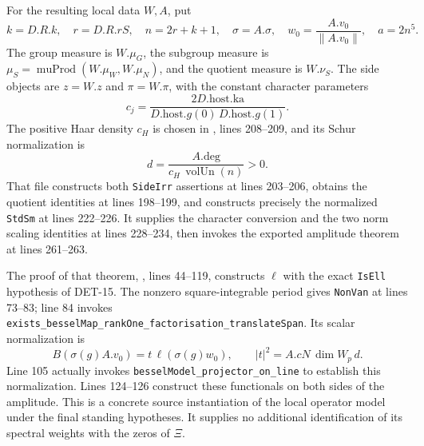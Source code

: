 \documentclass[11pt,a4paper]{article}
\newcommand{\fid}[1]{\textsf{#1}}
\begin{document}
For the resulting local data \(W,A\), put
\[
 k=D.R.k,\quad r=D.R.rS,\quad n=2r+k+1,\quad
 \sigma=A.\sigma,\quad w_0=\frac{A.v_0}{\|A.v_0\|},\quad a=2n^5.
\]
The group measure is \(W.\mu_G\), the subgroup measure is
\(\mu_S=\operatorname{muProd}(W.\mu_W,W.\mu_N)\), and the quotient
measure is \(W.\nu_S\).  The side objects are \(z=W.z\) and
\(\pi=W.\pi\), with the constant character parameters
\[
 c_j=\frac{2D.\mathrm{host}.\mathrm{ka}}
 {D.\mathrm{host}.g(0)\,D.\mathrm{host}.g(1)}.
\]
The positive Haar density \(c_H\) is chosen in
, lines 208--209, and its Schur
normalization is
\[
 d=\frac{A.\mathrm{deg}}{c_H\,\operatorname{volUn}(n)}>0.
\]
That file constructs both \texttt{SideIrr} assertions at lines
203--206, obtains the quotient identities at lines 198--199,
and constructs precisely the normalized \texttt{StdSm} at lines
222--226.  It supplies the character conversion and the two norm
scaling identities at lines 228--234, then invokes the exported
amplitude theorem at lines 261--263.

The proof of that theorem,
,
lines 44--119, constructs \(\ell\) with the exact
\texttt{IsEll} hypothesis of \fid{DET-15}.
The nonzero square-integrable period gives \texttt{NonVan} at
lines 73--83; line 84 invokes
\texttt{exists\_besselMap\_rankOne\_factorisation\_translateSpan}.
Its scalar normalization is
\[
 B(\sigma(g)A.v_0)=t\,\ell(\sigma(g)w_0),\qquad
 |t|^2=A.cN\,\dim W_p\,d.
\]
Line 105 actually invokes
\texttt{besselModel\_projector\_on\_line} to establish this
normalization.  Lines 124--126 construct these functionals on
both sides of the amplitude.  This is a concrete source
instantiation of the local operator model under the final standing
hypotheses.  It supplies no additional identification of its
spectral weights with the zeros of \(\Xi\).
\end{document}
